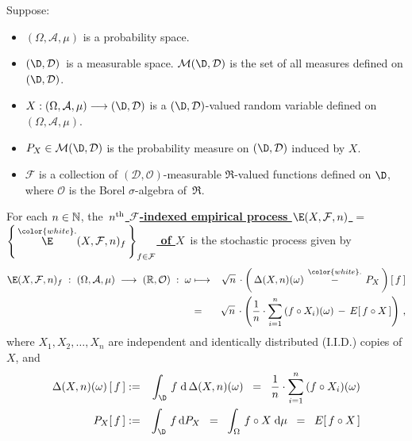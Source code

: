 \begin{definition}
\mbox{}\vskip 0.1cm
\noindent
Suppose:
\begin{itemize}
\item
	$(\Omega,\mathcal{A},\mu)$ is a probability space.
\item
	$(\D,\mathcal{D})$\, is a measurable space.
	$\mathcal{M}(\D,\mathcal{D})$ is the set of all measures defined on $(\D,\mathcal{D})$.
\item
	$X : (\Omega,\mathcal{A},\mu) \longrightarrow (\D,\mathcal{D})$
	is a $(\D,\mathcal{D})$-valued random variable defined on
	$(\Omega,\mathcal{A},\mu)$.
\item
	$P_{X} \in \mathcal{M}(\D,\mathcal{D})$ is the probability measure
	on $(\D,\mathcal{D})$ induced by $X$.
\item
	$\mathcal{F}$ is a collection of $(\mathcal{D},\mathcal{O})$-measurable $\Re$-valued functions
	defined on $\D$, where $\mathcal{O}$ is the Borel $\sigma$-algebra of \,$\Re$.
\end{itemize}
For each $n\in\mathbb{N}$, the
\,\underline{\textbf{$n^{\textnormal{th}}$ $\mathcal{F}$-indexed empirical process
	$\E(X,\mathcal{F},n)$ $=$
	$\left\{\,\overset{{\color{white}.}}{\E}(X,\mathcal{F},n)_{f}\,\right\}_{f\in\mathcal{F}}$ of $X$}}\,
is the stochastic process given by
\begin{eqnarray*}
\E(X,\mathcal{F},n)_{f}
	\; : \; (\Omega,\mathcal{A},\mu) \;\longrightarrow\; (\Re,\mathcal{O})
	\; : \; \omega
&\longmapsto&
	\sqrt{n}\,\cdot
	\left(\,\Delta(X,n)(\omega) \,\overset{{\color{white}.}}{-}\, P_{X}\,\right)[\,f\,]
\\
& = &
	\sqrt{n}\,\cdot
	\left(
		\dfrac{1}{n}\cdot\overset{n}{\underset{i=1}{\sum}}\,(f \circ X_{i})(\omega)
		\, - \,
		E\!\left[\,f \circ X\,\right]
	\right)
	\,,
\end{eqnarray*}
where $X_{1}, X_{2}, \ldots, X_{n}$ are independent and identically distributed (I.I.D.) copies of $X$,
and
\begin{eqnarray*}
\Delta(X,n)(\omega)\left[\,f\,\right]
&:=&
	\int_{\D}\, f \;\d\,\Delta(X,n)(\omega)
\;\; = \;\;
	\dfrac{1}{n}\cdot
	\overset{n}{\underset{i=1}{\sum}}\,(f \circ X_{i})(\omega) 
\\
P_{X}\!\left[\,f\,\right]
& := &
	\int_{\D}\,f\,\d P_{X}
\;\; = \;\;
	\int_{\Omega}\,f \circ X \;\d\mu
\;\; = \;\;
	E\!\left[\,f \circ X\,\right]
\end{eqnarray*}
\end{definition}

